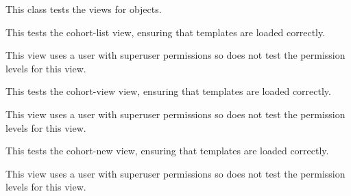 \documentclass[letterpaper,10pt,english]{sphinxmanual}
\begin{document}

\begin{fulllineitems}
\label{data:mousedb.data.tests.CohortViewTests}
This class tests the views for {\hyperref[data:mousedb.data.models.Cohort]{}} objects.

\begin{fulllineitems}
\label{data:mousedb.data.tests.CohortViewTests.test_cohort_list}
This tests the cohort-list view, ensuring that templates are loaded correctly.

This view uses a user with superuser permissions so does not test the permission levels for this view.

\end{fulllineitems}


\begin{fulllineitems}
\label{data:mousedb.data.tests.CohortViewTests.test_cohort_view}
This tests the cohort-view view, ensuring that templates are loaded correctly.

This view uses a user with superuser permissions so does not test the permission levels for this view.

\end{fulllineitems}


\begin{fulllineitems}
\label{data:mousedb.data.tests.CohortViewTests.test_cohort_view_create}
This tests the cohort-new view, ensuring that templates are loaded correctly.

This view uses a user with superuser permissions so does not test the permission levels for this view.

\end{fulllineitems}



\end{fulllineitems}
\end{document}
